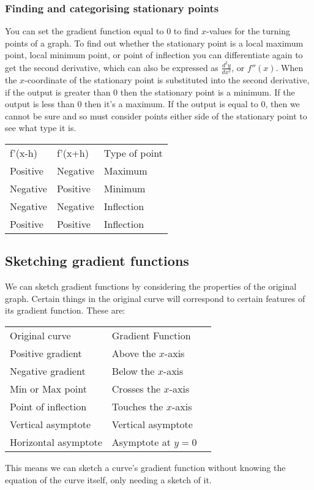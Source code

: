\subsubsection{Finding and categorising stationary points}
You can set the gradient function equal to 0 to find $x$-values for the turning points of a graph. To find out whether the stationary point is a local maximum point, local minimum point, or point of inflection you can differentiate again to get the second derivative, which can also be expressed as $\frac{d^2y}{dx^2}$, or $f''(x)$. When the $x$-coordinate of the stationary point is substituted into the second derivative, if the output is greater than 0 then the stationary point is a minimum. If the output is less than 0 then it's a maximum. If the output is equal to 0, then we cannot be sure and so must consider points either side of the stationary point to see what type it is.
\begin{table}[h]
	\center
\begin{tabular}{lll}
f'(x-h)  & f'(x+h)  & Type of point \\
Positive & Negative & Maximum       \\
Negative & Positive & Minimum       \\
Negative & Negative & Inflection    \\
Positive & Positive & Inflection
\end{tabular}
\end{table}

\subsection{Sketching gradient functions}
We can sketch gradient functions by considering the properties of the original graph. Certain things in the original curve will correspond to certain features of its gradient function. These are:
\begin{table}[h]
	\center
\begin{tabular}{lll}
Original curve       & Gradient Function    \\
Positive gradient    & Above the $x$-axis   \\
Negative gradient    & Below the $x$-axis   \\
Min or Max point     & Crosses the $x$-axis \\
Point of inflection  & Touches the $x$-axis \\
Vertical asymptote   & Vertical asymptote   \\
Horizontal asymptote & Asymptote at $y=0$   \\
\end{tabular}
\end{table}
This means we can sketch a curve's gradient function without knowing the equation of the curve itself, only needing a sketch of it.

